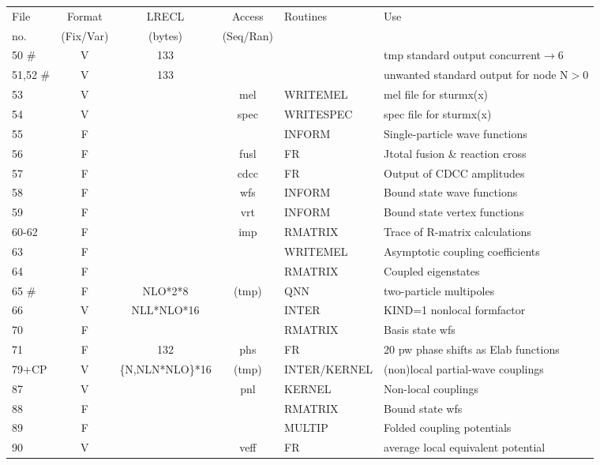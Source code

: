 \documentclass[11pt]{article}
\begin{document}
\begin{tabular}{|l | c c c | l | l|}
\hline
File & Format & LRECL  & Access & Routines & Use \\
 no. & (Fix/Var) & (bytes) & (Seq/Ran) &  &  \\
\hline
50  \#  & V &   133  &    &    &    tmp standard output concurrent$\rightarrow$6\\
51,52 \#  & V &   133  &    &  & unwanted standard output for node N$>$0\\
53    &   V &            &  mel  &     WRITEMEL & mel file for sturmx(x)\\
54    &   V &            &   spec  &     WRITESPEC & spec file for sturmx(x)\\
55    &   F &            &    &     INFORM & Single-particle wave functions\\
56    &   F &            &  fusl  &     FR & Jtotal fusion \& reaction cross\\
57    &   F &            &   cdcc &     FR & Output of CDCC amplitudes\\
58    &   F &            &  wfs  &     INFORM & Bound state wave functions \\
59    &   F &            &   vrt &     INFORM & Bound state vertex functions \\
60-62 &   F &            &  imp  &     RMATRIX & Trace of R-matrix calculations\\
63    &   F &            &    &     WRITEMEL& Asymptotic coupling coefficients\\
64    &   F &            &    &     RMATRIX& Coupled eigenstates\\
65 \# &  F  &   NLO*2*8  & (tmp)   &     QNN  &  two-particle multipoles\\
66    &  V  &NLL*NLO*16  & &     INTER & KIND=1 nonlocal formfactor\\
70    &   F &            &    &     RMATRIX& Basis state wfs\\
71    &   F &    132     &phs &     FR   &  20 pw phase shifts as Elab functions\\
79+CP  &  V &\{N,NLN*NLO\}*16 & (tmp)  &   INTER/KERNEL &(non)local partial-wave couplings\\
87    &   V &            &   pnl &     KERNEL & Non-local couplings\\
88    &   F &            &    &     RMATRIX& Bound state wfs\\
89    &   F &            &    &     MULTIP& Folded coupling potentials\\
90    &  V &           &veff &       FR   &   average local equivalent potential\\

\end{tabular}
\end{document}
